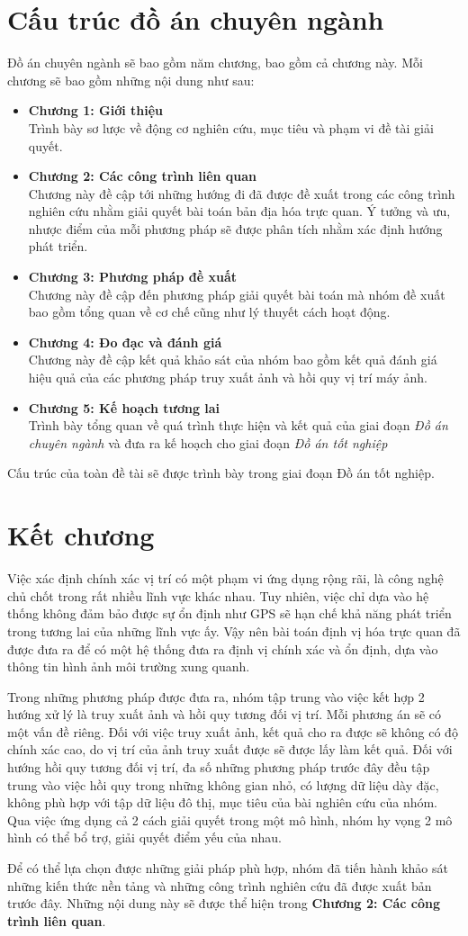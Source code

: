 \section{Cấu trúc đồ án chuyên ngành}
Đồ án chuyên ngành sẽ bao gồm năm chương, bao gồm cả chương này. Mỗi chương sẽ bao gồm những nội dung như sau:
\begin{itemize}
    \item \textbf{Chương 1: Giới thiệu} \\
    Trình bày sơ lược về động cơ nghiên cứu, mục tiêu và phạm vi đề tài giải quyết.
    \item \textbf{Chương 2: Các công trình liên quan} \\
    Chương này đề cập tới những hướng đi đã được đề xuất trong các công trình nghiên cứu nhằm giải quyết bài toán bản địa hóa trực quan. Ý tưởng và ưu, nhược điểm của mỗi phương pháp sẽ được phân tích nhằm xác định hướng phát triển.
    \item \textbf{Chương 3: Phương pháp đề xuất} \\
    Chương này đề cập đến phương pháp giải quyết bài toán mà nhóm đề xuất bao gồm tổng quan về cơ chế cũng như lý thuyết cách hoạt động.
    \item \textbf{Chương 4: Đo đạc và đánh giá} \\
    Chương này đề cập kết quả khảo sát của nhóm bao gồm kết quả đánh giá hiệu quả của các phương pháp truy xuất ảnh và hồi quy vị trí máy ảnh.
    \item \textbf{Chương 5: Kế hoạch tương lai} \\
    Trình bày tổng quan về quá trình thực hiện và kết quả của giai đoạn \textit{Đồ án chuyên ngành} và đưa ra kế hoạch cho giai đoạn \textit{Đồ án tốt nghiệp}
\end{itemize}
Cấu trúc của toàn đề tài sẽ được trình bày trong giai đoạn Đồ án tốt nghiệp.

\section{Kết chương}
Việc xác định chính xác vị trí có một phạm vi ứng dụng rộng rãi, là công nghệ chủ chốt trong rất nhiều lĩnh vực khác nhau. Tuy nhiên, việc chỉ dựa vào hệ thống không đảm bảo được sự ổn định như GPS sẽ hạn chế khả năng phát triển trong tương lai của những lĩnh vực ấy. Vậy nên bài toán định vị hóa trực quan đã được đưa ra để có một hệ thống đưa ra định vị chính xác và ổn định, dựa vào thông tin hình ảnh môi trường xung quanh.

Trong những phương pháp được đưa ra, nhóm tập trung vào việc kết hợp 2 hướng xử lý là truy xuất ảnh và hồi quy tương đối vị trí. Mỗi phương án sẽ có một vấn đề riêng. Đối với việc truy xuất ảnh, kết quả cho ra được sẽ không có độ chính xác cao, do vị trí của ảnh truy xuất được sẽ được lấy làm kết quả. Đối với hướng hồi quy tương đối vị trí, đa số những phương pháp trước đây đều tập trung vào việc hồi quy trong những không gian nhỏ, có lượng dữ liệu dày đặc, không phù hợp với tập dữ liệu đô thị, mục tiêu của bài nghiên cứu của nhóm. Qua việc ứng dụng cả 2 cách giải quyết trong một mô hình, nhóm hy vọng 2 mô hình có thể bổ trợ, giải quyết điểm yếu của nhau.

Để có thể lựa chọn được những giải pháp phù hợp, nhóm đã tiến hành khảo sát những kiến thức nền tảng và những công trình nghiên cứu đã được xuất bản trước đây. Những nội dung này sẽ được thể hiện trong \textbf{Chương 2: Các công trình liên quan}.
